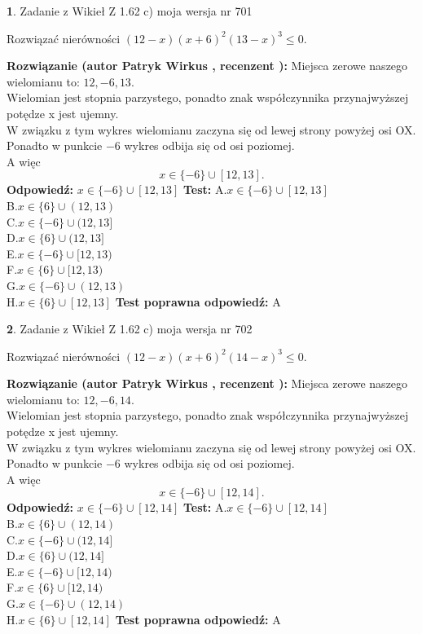 \documentclass[12pt, a4paper]{article}
\theoremstyle{definition} %
\newtheorem{zad}{}
\newcommand{\zadStart}[1]{\begin{zad}#1\newline}
\newcommand{\zadStop}{\end{zad}}
\newcommand{\rozwStart}[2]{\noindent \textbf{Rozwiązanie (autor #1 , recenzent #2): }\newline}
\newcommand{\rozwStop}{\newline}
\newcommand{\odpStart}{\noindent \textbf{Odpowiedź:}\newline}
\newcommand{\odpStop}{\newline}
\newcommand{\testStart}{\noindent \textbf{Test:}\newline}
\newcommand{\testStop}{\newline}
\newcommand{\kluczStart}{\noindent \textbf{Test poprawna odpowiedź:}\newline}
\newcommand{\kluczStop}{\newline}
\begin{document}
\zadStart{Zadanie z Wikieł Z 1.62 c) moja wersja nr 701}

Rozwiązać nierówności $(12-x)(x+6)^{2}(13-x)^{3}\le0$.
\zadStop
\rozwStart{Patryk Wirkus}{}
Miejsca zerowe naszego wielomianu to: $12, -6, 13$.\\
Wielomian jest stopnia parzystego, ponadto znak współczynnika przy\linebreak najwyższej potędze x jest ujemny.\\ W związku z tym wykres wielomianu zaczyna się od lewej strony powyżej osi OX.\\
Ponadto w punkcie $-6$ wykres odbija się od osi poziomej.\\
A więc $$x \in \{-6\} \cup [12,13].$$
\rozwStop
\odpStart
$x \in \{-6\} \cup [12,13]$
\odpStop
\testStart
A.$x \in \{-6\} \cup [12,13]$\\
B.$x \in \{6\} \cup (12,13)$\\
C.$x \in \{-6\} \cup (12,13]$\\
D.$x \in \{6\} \cup (12,13]$\\
E.$x \in \{-6\} \cup [12,13)$\\
F.$x \in \{6\} \cup [12,13)$\\
G.$x \in \{-6\} \cup (12,13)$\\
H.$x \in \{6\} \cup [12,13]$
\testStop
\kluczStart
A
\kluczStop



\zadStart{Zadanie z Wikieł Z 1.62 c) moja wersja nr 702}

Rozwiązać nierówności $(12-x)(x+6)^{2}(14-x)^{3}\le0$.
\zadStop
\rozwStart{Patryk Wirkus}{}
Miejsca zerowe naszego wielomianu to: $12, -6, 14$.\\
Wielomian jest stopnia parzystego, ponadto znak współczynnika przy\linebreak najwyższej potędze x jest ujemny.\\ W związku z tym wykres wielomianu zaczyna się od lewej strony powyżej osi OX.\\
Ponadto w punkcie $-6$ wykres odbija się od osi poziomej.\\
A więc $$x \in \{-6\} \cup [12,14].$$
\rozwStop
\odpStart
$x \in \{-6\} \cup [12,14]$
\odpStop
\testStart
A.$x \in \{-6\} \cup [12,14]$\\
B.$x \in \{6\} \cup (12,14)$\\
C.$x \in \{-6\} \cup (12,14]$\\
D.$x \in \{6\} \cup (12,14]$\\
E.$x \in \{-6\} \cup [12,14)$\\
F.$x \in \{6\} \cup [12,14)$\\
G.$x \in \{-6\} \cup (12,14)$\\
H.$x \in \{6\} \cup [12,14]$
\testStop
\kluczStart
A
\kluczStop
\end{document}
